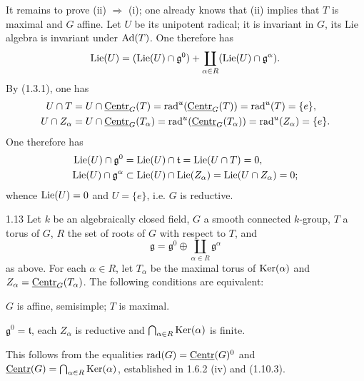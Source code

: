 It remains to prove (ii) $\Rightarrow$ (i); one already knows that (ii) implies that $T$ is maximal and $G$ affine. Let $U$ be its unipotent radical; it is invariant in $G$, its Lie algebra is invariant under $\operatorname{Ad}(T)$. One therefore has
\[
\operatorname{Lie}(U)=(\operatorname{Lie}(U)\cap\mathfrak g^0)+\coprod_{\alpha\in R}(\operatorname{Lie}(U)\cap\mathfrak g^\alpha).
\]
By (1.3.1), one has
\[
\begin{aligned}
U\cap T&=U\cap\underline{\mathrm{Centr}}_G(T)=\operatorname{rad}^{u}(\underline{\mathrm{Centr}}_G(T))=\operatorname{rad}^{u}(T)=\{e\},\\
U\cap Z_\alpha&=U\cap\underline{\mathrm{Centr}}_G(T_\alpha)=\operatorname{rad}^{u}(\underline{\mathrm{Centr}}_G(T_\alpha))=\operatorname{rad}^{u}(Z_\alpha)=\{e\}.
\end{aligned}
\]
One therefore has{\renewcommand{\thefootnote}{(13)}}
\[
\begin{aligned}
\operatorname{Lie}(U)\cap\mathfrak g^0&=\operatorname{Lie}(U)\cap\mathfrak t=\operatorname{Lie}(U\cap T)=0,\\
\operatorname{Lie}(U)\cap\mathfrak g^\alpha&\subset\operatorname{Lie}(U)\cap\operatorname{Lie}(Z_\alpha)=\operatorname{Lie}(U\cap Z_\alpha)=0;
\end{aligned}
\]
whence $\operatorname{Lie}(U)=0$ and $U=\{e\}$, i.e. $G$ is reductive.

\begin{corollary}{1.13}\label{XIX.1.13}
Let $k$ be an algebraically closed field, $G$ a smooth connected $k$-group, $T$ a torus of $G$, $R$ the set of roots of $G$ with respect to $T$, and
\[
\mathfrak g=\mathfrak g^0\oplus\coprod_{\alpha\in R}\mathfrak g^\alpha
\]
as above. For each $\alpha\in R$, let $T_\alpha$ be the maximal torus of $\operatorname{Ker}(\alpha)$ and $Z_\alpha=\underline{\mathrm{Centr}}_G(T_\alpha)$. The following conditions are equivalent:
\begin{enumeratei}
\item $G$ is affine, semisimple; $T$ is maximal.
\item $\mathfrak g^0=\mathfrak t$, each $Z_\alpha$ is reductive and $\bigcap_{\alpha\in R}\operatorname{Ker}(\alpha)$ is finite.
\end{enumeratei}
\end{corollary}
{\renewcommand{\thefootnote}{(14)}}%
This follows from the equalities $\operatorname{rad}(G)=\underline{\mathrm{Centr}}(G)^0$ and $\underline{\mathrm{Centr}}(G)=\bigcap_{\alpha\in R}\operatorname{Ker}(\alpha)$, established in 1.6.2 (iv) and (1.10.3).

